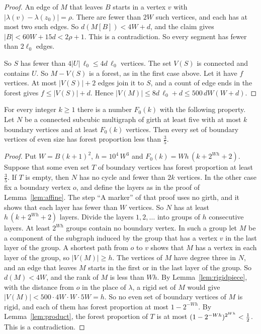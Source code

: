 \begin{proof}
An edge of $M$ that leaves $B$ starts in a vertex $v$ with $|\lambda(v)-\lambda(z_0)|=\rho$.
There are fewer than $2W$ such vertices, and each has at most two such edges. So
$d(M[B])<4W+d$, and the claim gives $|B|<60W+15d<2\rho+1$. This is a contradiction. So every
segment has fewer than $2\ell_0$ edges.

 So $S$ has fewer than $4|U|\,\ell_0\le4d\,\ell_0$ vertices. The set $V(S)$ is
connected and contains $U$. So $M-V(S)$ is a forest, as in the first case above. Let it have $f$
vertices. At most $|V(S)|+2$ edges join it to $S$, and a count of edge ends in the forest gives
$f\le|V(S)|+d$. Hence $|V(M)|\le8d\,\ell_0+d\le500\,dW(W+d)$.
\end{proof}

\begin{lemma}\label{lem:piecesfive}
For every integer $k\ge1$ there is a number $F_0(k)$ with the following property. Let $N$ be a
connected subcubic multigraph of girth at least five with at most $k$ boundary vertices and at
least $F_0(k)$ vertices. Then every set of boundary vertices of even size has forest proportion
less than $\frac35$.
\end{lemma}

\begin{proof}
Put $W=B(k+1)^{2}$, $h=10^{4}\,W^{3}$ and $F_0(k)=Wh\,(k+2^{Wh}+2)$. Suppose that some even set
$T$ of boundary vertices has forest proportion at least $\frac35$. If $T$ is empty, then $N$ has
no cycle and fewer than $2k$ vertices. In the other case fix a boundary vertex $o$, and define the
layers as in the proof of Lemma~\ref{lem:affine}. The step ``A marker'' of that proof uses no
girth, and it shows that each layer has fewer than $W$ vertices. So $N$ has at least
$h\,(k+2^{Wh}+2)$ layers. Divide the layers $1,2,\dots$ into groups of $h$ consecutive layers. At
least $2^{Wh}$ groups contain no boundary vertex. In such a group let $M$ be a component of the
subgraph induced by the group that has a vertex $v$ in the last layer of the group. A shortest
path from $o$ to $v$ shows that $M$ has a vertex in each layer of the group, so $|V(M)|\ge h$.
The vertices of $M$ have degree three in $N$, and an edge that leaves $M$ starts in the first or
in the last layer of the group. So $d(M)<4W$, and the rank of $M$ is less than $Wh$. By
Lemma~\ref{lem:rigidpiece}, with the distance from $o$ in the place of $\lambda$, a rigid set of
$M$ would give $|V(M)|<500\cdot4W\cdot W\cdot5W=h$. So no even set of boundary vertices of $M$ is
rigid, and each of them has forest proportion at most $1-2^{-Wh}$. By Lemma~\ref{lem:product},
the forest proportion of $T$ is at most $(1-2^{-Wh})^{2^{Wh}}<\tfrac12$. This is a contradiction.
\end{proof}

